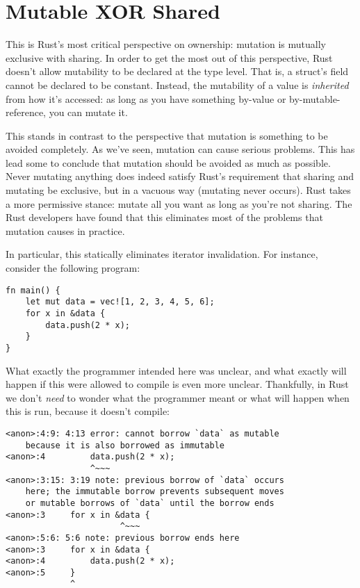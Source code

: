 \section{Mutable XOR Shared}

This is Rust's most critical perspective on ownership: mutation is mutually
exclusive with sharing. In order to get the most out of this perspective, Rust
doesn't allow mutability to be declared at the type level. That is, a struct's
field cannot be declared to be constant. Instead, the mutability of a value is
\emph{inherited} from how it's accessed: as long as you have something by-value or
by-mutable-reference, you can mutate it.

This stands in contrast to the perspective that mutation is something to be
avoided completely. As we've seen, mutation can cause serious problems. This
has lead some to conclude that mutation should be avoided as much
as possible. Never mutating anything does indeed satisfy Rust's requirement
that sharing and mutating be exclusive, but in a vacuous way (mutating never
occurs). Rust takes a more permissive stance: mutate all you want as long
as you're not sharing. The Rust developers have found that this eliminates
most of the problems that mutation causes in practice.

In particular, this statically eliminates iterator invalidation. For
instance, consider the following program:

\begin{verbatim}
fn main() {
    let mut data = vec![1, 2, 3, 4, 5, 6];
    for x in &data {
        data.push(2 * x);
    }
}
\end{verbatim}

What exactly the programmer intended here was unclear, and what exactly
will happen if this were allowed to compile is even more unclear.
Thankfully, in Rust we don't \emph{need} to wonder what the programmer meant or
what will happen when this is run, because it doesn't compile:

\begin{verbatim}
<anon>:4:9: 4:13 error: cannot borrow `data` as mutable
    because it is also borrowed as immutable
<anon>:4         data.push(2 * x);
                 ^~~~
<anon>:3:15: 3:19 note: previous borrow of `data` occurs
    here; the immutable borrow prevents subsequent moves
    or mutable borrows of `data` until the borrow ends
<anon>:3     for x in &data {
                       ^~~~
<anon>:5:6: 5:6 note: previous borrow ends here
<anon>:3     for x in &data {
<anon>:4         data.push(2 * x);
<anon>:5     }
             ^
\end{verbatim}

